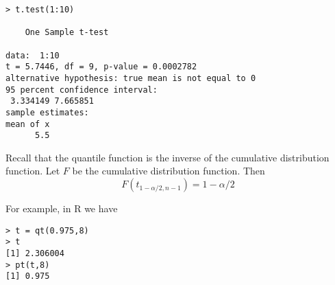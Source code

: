 \documentclass[12pt]{article}
\begin{document}
\begin{Verbatim}
> t.test(1:10)

	One Sample t-test

data:  1:10
t = 5.7446, df = 9, p-value = 0.0002782
alternative hypothesis: true mean is not equal to 0
95 percent confidence interval:
 3.334149 7.665851
sample estimates:
mean of x 
      5.5 
\end{Verbatim}

Recall that the quantile function
is the inverse of the cumulative
distribution function.
Let $F$ be the cumulative distribution function.
Then
\[
F(t_{1-\alpha/2,n-1})=1-\alpha/2
\]

For example, in R we have

\begin{Verbatim}
> t = qt(0.975,8)
> t
[1] 2.306004
> pt(t,8)
[1] 0.975
\end{Verbatim}
\end{document}
